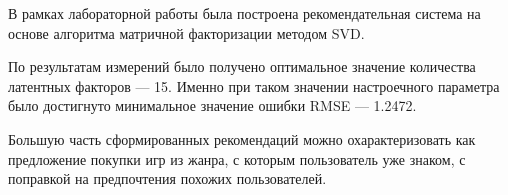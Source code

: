 
В рамках лабораторной работы была построена рекомендательная система на основе алгоритма матричной факторизации методом SVD.

По результатам измерений было получено оптимальное значение количества латентных факторов --- 15. Именно при таком значении настроечного параметра было достигнуто минимальное значение ошибки RMSE --- 1.2472.

Большую часть сформированных рекомендаций можно охарактеризовать как предложение покупки игр из жанра, с которым пользователь уже знаком, с поправкой на предпочтения похожих пользователей.
